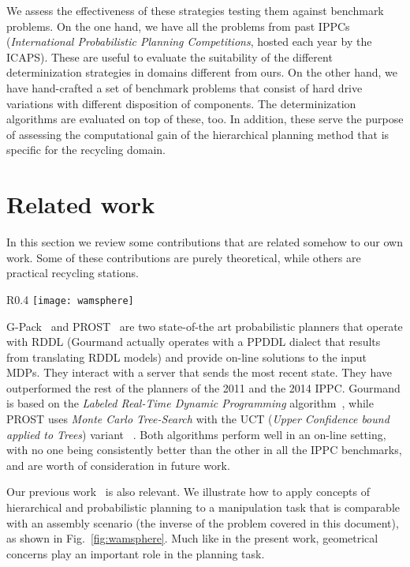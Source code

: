\documentclass[../root.tex]{subfiles}
\begin{document}
We assess the effectiveness of these strategies testing them against
benchmark problems. On the one hand, we have all the problems from past
IPPCs
(\emph{International Probabilistic Planning Competitions}, hosted
each year by the ICAPS). These are useful to evaluate the suitability of
the different
determinization strategies in domains different from ours. On the other hand,
we have hand-crafted a set of benchmark problems that consist of
hard drive variations with different disposition of components. The determinization
algorithms are evaluated on top of these, too. In addition, these serve
the purpose of assessing the computational gain of the hierarchical planning
method that is specific for the recycling domain.

\section{Related work}

In this section we review some contributions that are related
somehow to our own work. Some of these contributions are purely
theoretical, while others are practical recycling stations.

\begin{wrapfigure}{R}{0.4\columnwidth}
	\centering
	\texttt{[image: wamsphere]}
	\caption{Barrett WAM robotic arm inserting a triangular piece through
		a cavity with the same shape}
	\label{fig:wamsphere}
\end{wrapfigure}

G-Pack~\cite{kolobov2012blrtdp} and PROST~\cite{keller2013atrial}
are two state-of-the art probabilistic
planners that operate with RDDL (Gourmand actually operates with a PPDDL dialect
that results from translating RDDL models) and provide on-line solutions to
the input MDPs. They interact with a server that sends the most recent state.
They have outperformed the rest of the planners of the 2011
and the 2014
IPPC. Gourmand is based on the \emph{Labeled Real-Time Dynamic Programming}
algorithm~\cite{bonet2003labeled}, while PROST uses \emph{Monte Carlo Tree-Search}
with the UCT (\emph{Upper Confidence bound applied to Trees}) variant%
~\cite{kocsis2006bandit}. Both
algorithms perform well in an on-line setting, with no one being consistently
better than the other in all the IPPC benchmarks, and are worth of consideration
in future work.

Our previous work~\cite{suarez2018interleaving} is
also relevant. We illustrate how to apply concepts of hierarchical and
probabilistic planning to a manipulation task that is comparable with an
assembly scenario (the inverse of the problem covered in this document),
as shown in Fig.~\ref{fig:wamsphere}. Much like in the present work,
geometrical concerns play an important role in the planning task.
\end{document}
